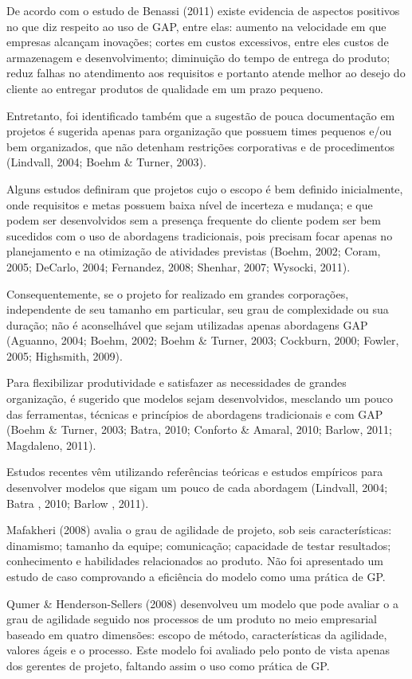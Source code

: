 De acordo com o estudo de Benassi (2011) existe evidencia de aspectos positivos no que diz respeito ao uso de GAP, entre elas: aumento na velocidade em que empresas alcançam inovações; cortes em custos excessivos, entre eles custos de armazenagem e desenvolvimento; diminuição do tempo de entrega do produto; reduz falhas no atendimento aos requisitos e portanto atende melhor ao desejo do cliente ao entregar produtos de qualidade em um prazo pequeno.

Entretanto, foi identificado também que a sugestão de pouca documentação em projetos é sugerida apenas para organização que possuem times pequenos e/ou bem organizados, que não detenham restrições corporativas e de procedimentos (Lindvall, 2004; Boehm \& Turner, 2003).

Alguns estudos definiram que projetos cujo o escopo é bem definido inicialmente, onde requisitos e metas possuem baixa nível de incerteza e mudança; e que podem ser desenvolvidos sem a presença frequente do cliente podem ser bem sucedidos com o uso de abordagens tradicionais, pois precisam focar apenas no planejamento e na otimização de atividades previstas (Boehm, 2002; Coram, 2005; DeCarlo, 2004; Fernandez, 2008; Shenhar, 2007; Wysocki, 2011).

Consequentemente, se o projeto for realizado em grandes corporações, independente de seu tamanho em particular, seu grau de complexidade ou sua duração; não é aconselhável que sejam utilizadas apenas abordagens GAP (Aguanno, 2004; Boehm, 2002; Boehm \& Turner, 2003; Cockburn, 2000; Fowler, 2005; Highsmith, 2009).

Para flexibilizar produtividade e satisfazer as necessidades de grandes organização, é sugerido que modelos sejam desenvolvidos, mesclando um pouco das ferramentas, técnicas e princípios de abordagens tradicionais e com GAP (Boehm \& Turner, 2003; Batra, 2010; Conforto \& Amaral, 2010; Barlow, 2011; Magdaleno, 2011).

Estudos recentes vêm utilizando referências teóricas e estudos empíricos para desenvolver modelos que sigam um pouco de cada abordagem (Lindvall, 2004; Batra , 2010; Barlow , 2011).

Mafakheri (2008) avalia o grau de agilidade de projeto, sob seis características: dinamismo; tamanho da equipe; comunicação; capacidade de testar resultados; conhecimento e habilidades relacionados ao produto. Não foi apresentado um estudo de caso comprovando a eficiência do modelo como uma prática de GP.

Qumer \& Henderson-Sellers (2008) desenvolveu um modelo que pode avaliar o a grau de agilidade seguido nos processos de um produto no meio empresarial baseado em quatro dimensões: escopo de método, características da agilidade, valores ágeis e o processo. Este modelo foi avaliado pelo ponto de vista apenas dos gerentes de projeto, faltando assim o uso como prática de GP.

